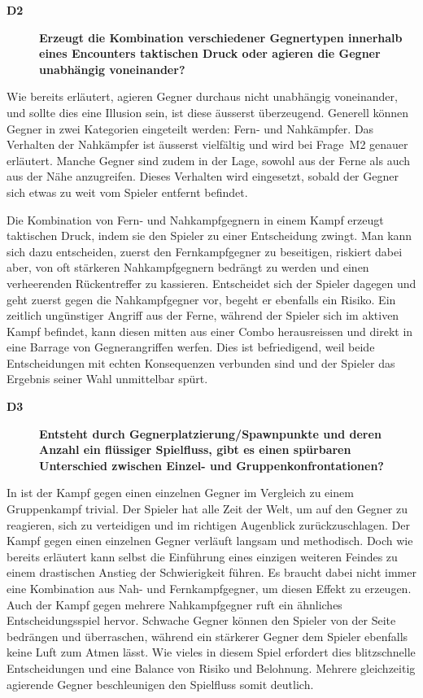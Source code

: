 \documentclass[../Main.tex]{subfiles}
\begin{document}
\begin{description}
    \item[\textbf{D2}] \textbf{Erzeugt die Kombination verschiedener Gegnertypen innerhalb eines Encounters taktischen Druck oder agieren die Gegner unabhängig voneinander?}
\end{description}

Wie bereits erläutert, agieren Gegner durchaus nicht unabhängig voneinander, und sollte dies eine Illusion sein, ist diese äusserst überzeugend. Generell können Gegner in zwei Kategorien eingeteilt werden: Fern- und Nahkämpfer. Das Verhalten der Nahkämpfer ist äusserst vielfältig und wird bei Frage~M2 genauer erläutert. Manche Gegner sind zudem in der Lage, sowohl aus der Ferne als auch aus der Nähe anzugreifen. Dieses Verhalten wird eingesetzt, sobald der Gegner sich etwas zu weit vom Spieler entfernt befindet.

Die Kombination von Fern- und Nahkampfgegnern in einem Kampf erzeugt taktischen Druck, indem sie den Spieler zu einer Entscheidung zwingt. Man kann sich dazu entscheiden, zuerst den Fernkampfgegner zu beseitigen, riskiert dabei aber, von oft stärkeren Nahkampfgegnern bedrängt zu werden und einen verheerenden Rückentreffer zu kassieren. Entscheidet sich der Spieler dagegen und geht zuerst gegen die Nahkampfgegner vor, begeht er ebenfalls ein Risiko. Ein zeitlich ungünstiger Angriff aus der Ferne, während der Spieler sich im aktiven Kampf befindet, kann diesen mitten aus einer Combo herausreissen und direkt in eine Barrage von Gegnerangriffen werfen. Dies ist befriedigend, weil beide Entscheidungen mit echten Konsequenzen verbunden sind und der Spieler das Ergebnis seiner Wahl unmittelbar spürt.

\begin{description}
    \item[\textbf{D3}] \textbf{Entsteht durch Gegnerplatzierung/Spawnpunkte und deren Anzahl ein flüssiger Spielfluss, gibt es einen spürbaren Unterschied zwischen Einzel- und Gruppenkonfrontationen?}
\end{description}

In  ist der Kampf gegen einen einzelnen Gegner im Vergleich zu einem Gruppenkampf trivial. Der Spieler hat alle Zeit der Welt, um auf den Gegner zu reagieren, sich zu verteidigen und im richtigen Augenblick zurückzuschlagen. Der Kampf gegen einen einzelnen Gegner verläuft langsam und methodisch. Doch wie bereits erläutert kann selbst die Einführung eines einzigen weiteren Feindes zu einem drastischen Anstieg der Schwierigkeit führen. Es braucht dabei nicht immer eine Kombination aus Nah- und Fernkampfgegner, um diesen Effekt zu erzeugen. Auch der Kampf gegen mehrere Nahkampfgegner ruft ein ähnliches Entscheidungsspiel hervor. Schwache Gegner können den Spieler von der Seite bedrängen und überraschen, während ein stärkerer Gegner dem Spieler ebenfalls keine Luft zum Atmen lässt. Wie vieles in diesem Spiel erfordert dies blitzschnelle Entscheidungen und eine Balance von Risiko und Belohnung. Mehrere gleichzeitig agierende Gegner beschleunigen den Spielfluss somit deutlich.
\end{document}

